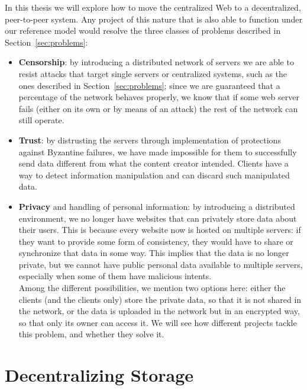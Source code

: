 \documentclass[mscthesis]{usiinfthesis}
\begin{document}
In this thesis we will explore how to move the centralized Web to a decentralized, peer-to-peer system. Any project of this nature that is also able to function under our reference model would resolve the three classes of problems described in Section~\ref{sec:problems}:
\begin{itemize}
	\item \textbf{Censorship}: by introducing a distributed network of servers we are able to resist attacks that target single servers or centralized systems, such as the ones described in Section~\ref{sec:problems}; since we are guaranteed that a percentage of the network behaves properly, we know that if some web server fails (either on its own or by means of an attack) the rest of the network can still operate.
	
	\item \textbf{Trust}: by distrusting the servers through implementation of protections against Byzantine failures, we have made impossible for them to successfully send data different from what the content creator intended. Clients have a way to detect information manipulation and can discard such manipulated data.
	
	\item \textbf{Privacy} and handling of personal information: by introducing a distributed environment, we no longer have websites that can privately store data about their users. This is because every website now is hosted on multiple servers: if they want to provide some form of consistency, they would have to share or synchronize that data in some way. This implies that the data is no longer private, but we cannot have public personal data available to multiple servers, especially when some of them have malicious intents.\\
	Among the different possibilities, we mention two options here: either the clients (and the clients only) store the private data, so that it is not shared in the network, or the data is uploaded in the network but in an encrypted way, so that only its owner can access it. We will see how different projects tackle this problem, and whether they solve it.
\end{itemize}

\chapter{Decentralizing Storage}\label{ch:storage}
\end{document}
